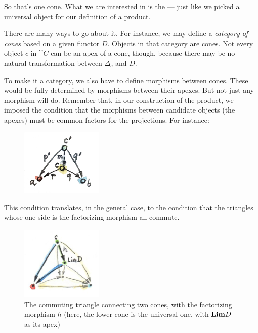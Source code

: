 \noindent
So that's one cone. What we are interested in is the  --- just like we picked a universal object for our definition of a
product.

There are many ways to go about it. For instance, we may define a
\emph{category of cones} based on a given functor $D$. Objects in that
category are cones. Not every object $c$ in $\cat{C}$ can be an
apex of a cone, though, because there may be no natural transformation
between $\Delta_c$ and $D$.

To make it a category, we also have to define morphisms between cones.
These would be fully determined by morphisms between their apexes. But
not just any morphism will do. Remember that, in our construction of the
product, we imposed the condition that the morphisms between candidate
objects (the apexes) must be common factors for the projections. For
instance:


\begin{figure}[H]
  \centering
  \includegraphics[width=0.35\textwidth]{images/productranking.jpg}
\end{figure}

This condition translates, in the general case, to the condition that
the triangles whose one side is the factorizing morphism all commute.

\begin{figure}[H]
  \centering
  \includegraphics[width=0.35\textwidth]{images/conecommutativity.jpg}
  \caption{The commuting triangle connecting two cones, with the factorizing
    morphism $h$ (here, the lower cone is the universal one, with
    $\Lim[D]$ as its apex)}
\end{figure}


